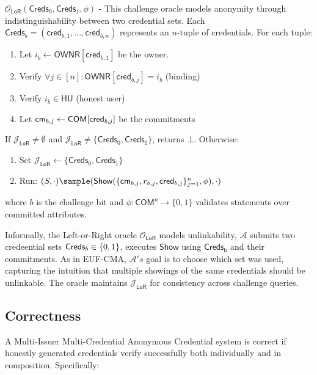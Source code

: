 \noindent $\mathcal{O}_{\mathsf{LoR}}(\mathsf{Creds}_0, \mathsf{Creds}_1, \phi)$ - This challenge oracle models anonymity through indistinguishability between two credential sets. Each $\mathsf{Creds}_b = (\mathsf{cred}_{b,1},\ldots,\mathsf{cred}_{b,n})$ represents an $n$-tuple of credentials. For each tuple:

\begin{enumerate}
    \item Let $i_b \gets \mathsf{OWNR}[\mathsf{cred}_{b,1}]$ be the owner.
    \item Verify $\forall j \in [n]: \mathsf{OWNR}[\mathsf{cred}_{b,j}] = i_b$ (binding)
    \item  Verify $i_b \in \mathsf{HU}$ (honest user)
    \item Let $\mathsf{cm}_{b,j} \gets \mathsf{COM}[\mathsf{cred}_{b,j}]$ be the commitments
\end{enumerate}

If $\mathcal{J}_{\mathsf{LoR}} \neq \emptyset$ and $\mathcal{J}_{\mathsf{LoR}} \neq \{\mathsf{Creds}_0, \mathsf{Creds}_1\}$, returns $\bot$. Otherwise:

\begin{enumerate}
    \item Set $\mathcal{J}_{\mathsf{LoR}} \gets \{\mathsf{Creds}_0, \mathsf{Creds}_1\}$
    \item Run: $(S, \cdot) \sample (\mathsf{Show}(\{\cm_{b,j}, r_{b,j}, \mathsf{cred}_{b,j}\}_{j=1}^n, \phi), \cdot)$
\end{enumerate}

where $b$ is the challenge bit and $\phi: \mathsf{COM}^n \rightarrow \{0,1\}$ validates statements over committed attributes.

Informally, the Left-or-Right oracle $\mathcal{O}_{\mathsf{LoR}}$ models unlinkability, $\mathcal{A}$ submits two credeential sets $\mathsf{Creds}_{b} \in \{0,1\}$, executes $\mathsf{Show}$ using $\mathsf{Creds_b}$ and their commitments. As in EUF-CMA, $\mathcal{A}'s$ goal is to choose which set was used, capturing the intuition that multiple showings of the same credentials should be unlinkable. The oracle maintains $\mathcal{J}_{\mathsf{LoR}}$ for consistency across challenge queries.


\subsection{Correctness}
A Multi-Issuer Multi-Credential Anonymous Credential system is correct if honestly generated credentials verify successfully both individually and in composition. Specifically:


